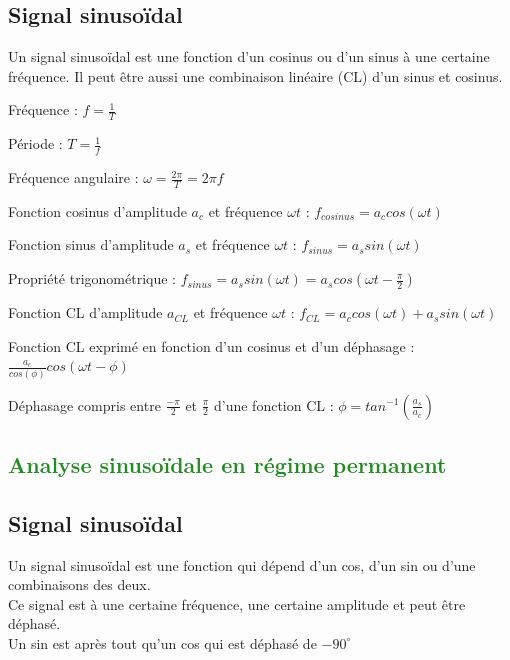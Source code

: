 \documentclass[11pt]{report}
\begin{document}
\section{Signal sinusoïdal}
Un signal sinusoïdal est une fonction d'un cosinus ou d'un sinus à une certaine fréquence. Il peut être aussi une combinaison linéaire (CL) d'un sinus et cosinus.
\begin{framed}
   Fréquence : $f = \frac{1}{T}$\newline

   Période : $T = \frac{1}{f}$\newline

   Fréquence angulaire : $\omega = \frac{2\pi}{T} = 2\pi f$\newline

   Fonction cosinus d'amplitude $a_c$ et fréquence $\omega t$ : $f_{cosinus} = a_ccos(\omega t)$\newline

   Fonction sinus d'amplitude $a_s$ et fréquence $\omega t$ : $f_{sinus} = a_ssin(\omega t)$\newline

   Propriété trigonométrique : $f_{sinus} = a_ssin(\omega t) =  a_scos(\omega t - \frac{\pi}{2})$\newline

   Fonction CL d'amplitude $a_{CL}$ et fréquence $\omega t$ : $f_{CL} = a_ccos(\omega t) + a_ssin(\omega t)$\newline

    Fonction CL exprimé en fonction d'un cosinus et d'un déphasage : $\frac{a_c}{cos(\phi)}cos(\omega t -\phi)$\newline

   Déphasage compris entre $\frac{-\pi}{2}$ et  $\frac{\pi}{2}$  d'une fonction CL : $\phi = tan^{-1} (\frac{a_s}{a_c})$\newline

\end{framed}


\textcolor{forestgreen}{\chapter{Analyse sinusoïdale en régime permanent}}
\section{Signal sinusoïdal}
Un signal sinusoïdal est une fonction qui dépend d'un cos, d'un sin ou d'une combinaisons des deux. \\
Ce signal est à une certaine fréquence, une certaine amplitude et peut être déphasé.\\
Un sin est après tout qu'un cos qui est déphasé de $- 90^{\circ}$
\end{document}
